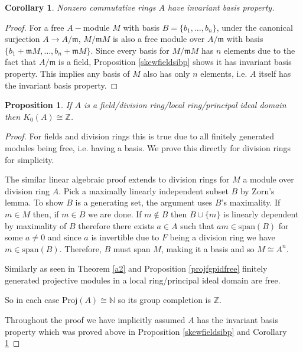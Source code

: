 \documentclass[12pt]{report}
\numberwithin{equation}{section}
\newcommand{\Z}{\mathbb{Z}}
\newcommand{\N}{\mathbb{N}}
\newcounter{dummy} \numberwithin{dummy}{section}
\newtheorem{corollary}[dummy]{Corollary}
\newtheorem{proposition}[dummy]{Proposition}
\begin{document}
	\begin{corollary}\label{comringibp}
		Nonzero commutative rings $A$ have invariant basis property.
	\end{corollary}
	\begin{proof}
		For a free $A-$module $M $ with basis $B=\{b_1, \ldots, b_n\}$, under the canonical surjection $A \to A/\mathfrak{m}$, $M/\mathfrak{m}M$ is also a free module over $A/\mathfrak{m}$ with basis $\{b_1+\mathfrak{m} M, \ldots, b_n + \mathfrak{m}M\}$. Since every basis for $M/\mathfrak{m}M$ has $n$ elements due to the fact that $A/\mathfrak{m}$ is a field, Proposition \ref{skewfieldsibp} shows it has invariant basis property. This implies any basis of $M$ also has only $n$ elements, i.e. $A$ itself has the invariant basis property.
	\end{proof}
	\begin{proposition}\label{k0pidisZ}
	If $A$ is a field/division ring/local ring/principal ideal domain then $K_0(A)\cong\Z$.
	\end{proposition}
	\begin{proof}
		For fields and division rings this is true due to all finitely generated modules being free, i.e. having a basis. We prove this directly for division rings for simplicity.
		
		The similar linear algebraic proof extends to division rings for $M$ a module over division ring $A$. Pick a maximally linearly independent subset $B$ by Zorn's lemma. To show \( B \) is a generating set, the argument uses \( B \)'s maximality. If \( m \in M \) then, if $m \in B$ we are done. If $m \not \in B$ then $B \cup \{m\}$ is linearly dependent by maximality of $B$ therefore there exists $a\in A$ such that $am \in \mathrm{span}(B)$ for some $a \neq 0$ and since $a $ is invertible due to $F$ being a division ring we have $m \in \mathrm{span}(B)$.
		Therefore, \( B \) must span \( M \), making it a basis and so $ M \cong A^n$.
		
		Similarly as seen in Theorem \ref{a2} and  Proposition \ref{projfgpidfree} finitely generated projective modules in a local ring/principal ideal domain are free.
		
		So in each case $\mathrm{Proj}(A) \cong \N$ so its group completion is $\Z.$ 
		
		Throughout the proof we have implicitly assumed $A$ has the invariant basis property which was proved above in Proposition \ref{skewfieldsibp} and Corollary \ref{comringibp}
		\end{proof}
		
\end{document}
